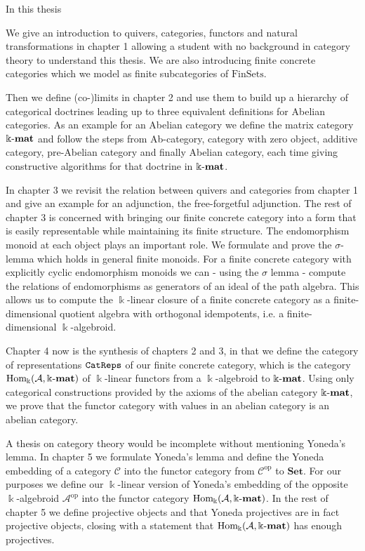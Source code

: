In this thesis 

We give an introduction to quivers, categories, functors and natural transformations in chapter 1 allowing a student with
no background in category theory to understand this thesis. We are also introducing finite concrete categories 
which we model as finite subcategories of $\mathrm{FinSets}$.

Then we define (co-)limits in chapter 2 and use them to build up a hierarchy of categorical doctrines leading up
to three equivalent definitions for Abelian categories.
As an example for an Abelian category we define the matrix category $\Bbbk\textnormal{-}\mathbf{mat}$
and follow the steps from Ab-category, category with zero object, additive category, pre-Abelian category and
finally Abelian category, each time giving constructive algorithms for that doctrine in $\Bbbk\textnormal{-}\mathbf{mat}$.

In chapter 3 we revisit the relation between quivers and categories from chapter 1
and give an example for an adjunction, the free-forgetful adjunction. The rest of chapter 3 is concerned with
bringing our finite concrete category into a form that is easily representable while maintaining its finite structure.
The endomorphism monoid at each object plays an important role. We formulate and prove the $\sigma$-lemma
which holds in general finite monoids. For a finite concrete category with explicitly
cyclic endomorphism monoids we can - using the $\sigma$ lemma -  compute the relations of endomorphisms as generators of an ideal
of the path algebra. This allows us to compute the $\Bbbk$-linear closure of a finite concrete category
as a finite-dimensional quotient algebra with orthogonal idempotents, i.e. a finite-dimensional $\Bbbk$-algebroid.

Chapter 4 now is the synthesis of chapters 2 and 3, in that we define the category of representations $\texttt{CatReps}$
of our finite concrete category, which is the category $\mathrm{Hom_{\Bbbk}}(\mathcal{A},\Bbbk\textnormal{-}\mathbf{mat})$ of $\Bbbk$-linear functors from a $\Bbbk$-algebroid
to $\Bbbk\textnormal{-}\mathbf{mat}$. Using only categorical constructions provided by the axioms of the abelian category $\Bbbk\textnormal{-}\mathbf{mat}$, we prove that
the functor category with values in an abelian category is an abelian category.

A thesis on category theory would be incomplete without mentioning Yoneda's lemma. In chapter 5 we
formulate Yoneda's lemma and define the Yoneda embedding of a category $\mathcal{C}$ into the
functor category from $\mathcal{C}^{\text{op}}$ to $\mathbf{Set}$. For our purposes we
define our $\Bbbk$-linear version of Yoneda's embedding of the opposite $\Bbbk$-algebroid $\mathcal{A}^{\text{op}}$
into the functor category $\mathrm{Hom_{\Bbbk}}(\mathcal{A},\Bbbk\textnormal{-}\mathbf{mat})$. In the rest of chapter 5 we define projective objects and that
Yoneda projectives are in fact projective objects, closing with a statement that $\mathrm{Hom_{\Bbbk}}(\mathcal{A},\Bbbk\textnormal{-}\mathbf{mat})$ has enough projectives.

